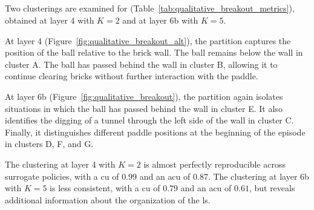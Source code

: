 \cleartoleftpage
\subsection{\BreakoutName}

Two clusterings are examined for \BreakoutName (Table~\ref{tab:qualitative_breakout_metrics}), obtained at layer 4 with $K=2$ and at layer 6b with $K=5$.

At layer 4 (Figure~\ref{fig:qualitative_breakout_alt}), the partition captures the position of the ball relative to the brick wall.
The ball remains below the wall in cluster A.
The ball has passed behind the wall in cluster B, allowing it to continue clearing bricks without further interaction with the paddle.

At layer 6b (Figure~\ref{fig:qualitative_breakout}), the partition again isolates situations in which the ball has passed behind the wall in cluster E.
It also identifies the digging of a tunnel through the left side of the wall in cluster C.
Finally, it distinguishes different paddle positions at the beginning of the episode in clusters D, F, and G.

The clustering at layer 4 with $K=2$ is almost perfectly reproducible across surrogate policies, with a \gls{cu} of $0.99$ and an \gls{acu} of $0.87$.
The clustering at layer 6b with $K=5$ is less consistent, with a \gls{cu} of $0.79$ and an \gls{acu} of $0.61$, but reveals additional information about the organization of the \gls{ls}.

